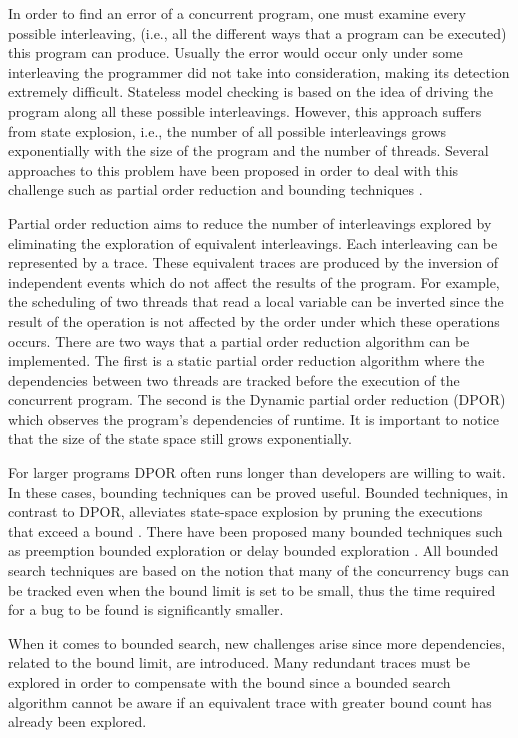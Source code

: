 In order to find an error of a concurrent program, one must examine every possible interleaving, (i.e., all the
different ways that a program can be executed) this program can produce. Usually the error would occur only under some
interleaving the programmer did not take into consideration, making its detection extremely difficult. Stateless model
checking is based on the idea of driving the program along all these possible interleavings. However, this approach
suffers from state explosion, i.e., the number of all possible interleavings grows exponentially with the size of the
program and the number of threads. Several approaches to this problem have been proposed in order to deal with this
challenge such as partial order reduction \cite{Godefroid1996} and bounding techniques \cite{BPOR}. 

Partial order reduction aims to reduce the number of interleavings explored by eliminating the 
exploration of equivalent interleavings. Each interleaving can be represented by a trace.
These equivalent traces are produced by the inversion of independent events which do not affect the results of the program. For example, the scheduling of two threads that read a local
variable can be inverted since the result of the operation is not affected by the order under which these operations occurs. 
There are two ways that a partial order reduction algorithm can be implemented. The first is a
static partial order reduction algorithm \cite{Static1997} where the dependencies between two threads are tracked before the execution of the concurrent program. 
The second is the Dynamic partial order reduction (DPOR) \cite{FlanaganDPOR} which observes the program's dependencies of runtime. It is important to notice that the size of
the state space still grows exponentially. 

For larger programs DPOR often runs longer than developers are willing to wait. In these cases, bounding techniques can be proved useful. Bounded techniques,
in contrast to DPOR, alleviates state-space explosion by pruning the executions that exceed a bound \cite{Thomson}. There have been proposed many bounded techniques
such as preemption bounded exploration \cite{BPOR} or delay bounded exploration \cite{Delay11}. All bounded search techniques are based on the notion that many of the concurrency bugs can be
tracked even when the bound limit is set to be small, thus the time required for a bug to be found is significantly smaller.

When it comes to bounded search, new challenges arise \cite{BPOR} since more dependencies, related to the bound limit, are introduced. 
Many redundant traces must be explored in order to compensate with the bound since a bounded search algorithm cannot be aware if an equivalent trace with greater bound count
has already been explored.

